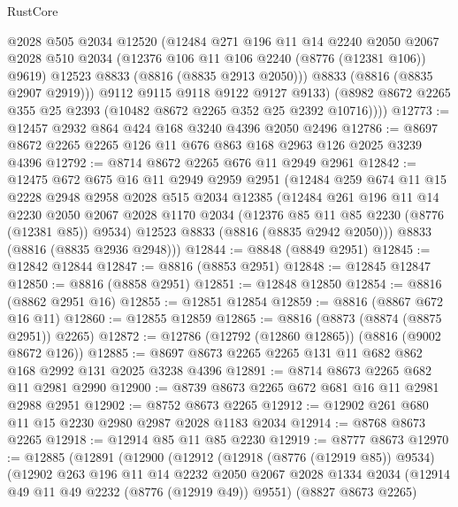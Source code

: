 \begin{lexlean}{RustCore}
\begin{coremodule}
            @2028
            @505
            @2034
            @12520
            (@12484
              @271
              @196
              @11
              @14
              @2240
              @2050
              @2067
              @2028
              @510
              @2034
              (@12376 @106 @11 @106 @2240 (@8776 (@12381 @106)) @9619)
              @12523
              @8833
              (@8816 (@8835 @2913 @2050)))
            @8833
            (@8816 (@8835 @2907 @2919)))
          @9112
          @9115
          @9118
          @9122
          @9127
          @9133)
        (@8982 @8672 @2265 @355 @25 @2393 (@10482 @8672 @2265 @352 @25 @2392 @10716))))
@12773 := @12457 @2932 @864 @424 @168 @3240 @4396 @2050 @2496
@12786 := @8697 @8672 @2265 @2265 @126 @11 @676 @863 @168 @2963 @126 @2025 @3239 @4396
@12792 := @8714 @8672 @2265 @676 @11 @2949 @2961
@12842 := @12475
    @672
    @675
    @16
    @11
    @2949
    @2959
    @2951
    (@12484
      @259
      @674
      @11
      @15
      @2228
      @2948
      @2958
      @2028
      @515
      @2034
      @12385
      (@12484
        @261
        @196
        @11
        @14
        @2230
        @2050
        @2067
        @2028
        @1170
        @2034
        (@12376 @85 @11 @85 @2230 (@8776 (@12381 @85)) @9534)
        @12523
        @8833
        (@8816 (@8835 @2942 @2050)))
      @8833
      (@8816 (@8835 @2936 @2948)))
@12844 := @8848 (@8849 @2951)
@12845 := @12842 @12844
@12847 := @8816 (@8853 @2951)
@12848 := @12845 @12847
@12850 := @8816 (@8858 @2951)
@12851 := @12848 @12850
@12854 := @8816 (@8862 @2951 @16)
@12855 := @12851 @12854
@12859 := @8816 (@8867 @672 @16 @11)
@12860 := @12855 @12859
@12865 := @8816 (@8873 (@8874 (@8875 @2951)) @2265)
@12872 := @12786 (@12792 (@12860 @12865)) (@8816 (@9002 @8672 @126))
@12885 := @8697 @8673 @2265 @2265 @131 @11 @682 @862 @168 @2992 @131 @2025 @3238 @4396
@12891 := @8714 @8673 @2265 @682 @11 @2981 @2990
@12900 := @8739 @8673 @2265 @672 @681 @16 @11 @2981 @2988 @2951
@12902 := @8752 @8673 @2265
@12912 := @12902 @261 @680 @11 @15 @2230 @2980 @2987 @2028 @1183 @2034
@12914 := @8768 @8673 @2265
@12918 := @12914 @85 @11 @85 @2230
@12919 := @8777 @8673
@12970 := @12885
    (@12891
      (@12900
        (@12912
          (@12918 (@8776 (@12919 @85)) @9534)
          (@12902
            @263
            @196
            @11
            @14
            @2232
            @2050
            @2067
            @2028
            @1334
            @2034
            (@12914 @49 @11 @49 @2232 (@8776 (@12919 @49)) @9551)
            (@8827 @8673 @2265)

\end{coremodule}
\end{lexlean}
